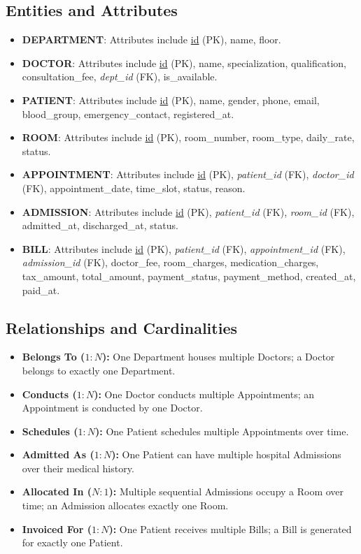 \documentclass[12pt,a4paper]{article}
\begin{document}
\subsection{Entities and Attributes}
\begin{itemize}[noitemsep]
    \item \textbf{DEPARTMENT}: Attributes include \underline{id} (PK), name, floor.
    \item \textbf{DOCTOR}: Attributes include \underline{id} (PK), name, specialization, qualification, consultation\_fee, \textit{dept\_id} (FK), is\_available.
    \item \textbf{PATIENT}: Attributes include \underline{id} (PK), name, gender, phone, email, blood\_group, emergency\_contact, registered\_at.
    \item \textbf{ROOM}: Attributes include \underline{id} (PK), room\_number, room\_type, daily\_rate, status.
    \item \textbf{APPOINTMENT}: Attributes include \underline{id} (PK), \textit{patient\_id} (FK), \textit{doctor\_id} (FK), appointment\_date, time\_slot, status, reason.
    \item \textbf{ADMISSION}: Attributes include \underline{id} (PK), \textit{patient\_id} (FK), \textit{room\_id} (FK), admitted\_at, discharged\_at, status.
    \item \textbf{BILL}: Attributes include \underline{id} (PK), \textit{patient\_id} (FK), \textit{appointment\_id} (FK), \textit{admission\_id} (FK), doctor\_fee, room\_charges, medication\_charges, tax\_amount, total\_amount, payment\_status, payment\_method, created\_at, paid\_at.
\end{itemize}

\subsection{Relationships and Cardinalities}
\begin{itemize}[noitemsep]
    \item \textbf{Belongs To ($1:N$):} One Department houses multiple Doctors; a Doctor belongs to exactly one Department.
    \item \textbf{Conducts ($1:N$):} One Doctor conducts multiple Appointments; an Appointment is conducted by one Doctor.
    \item \textbf{Schedules ($1:N$):} One Patient schedules multiple Appointments over time.
    \item \textbf{Admitted As ($1:N$):} One Patient can have multiple hospital Admissions over their medical history.
    \item \textbf{Allocated In ($N:1$):} Multiple sequential Admissions occupy a Room over time; an Admission allocates exactly one Room.
    \item \textbf{Invoiced For ($1:N$):} One Patient receives multiple Bills; a Bill is generated for exactly one Patient.
\end{itemize}
\end{document}
